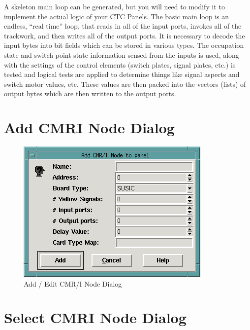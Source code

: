 A skeleton main loop can be generated, but you will need to modify it to
implement the actual logic of your CTC Panels.  The basic main loop is an
endless, ``real time'' loop, that reads in all of the input ports,
invokes all of the trackwork, and then writes all of the output ports. 
It is necessary to decode the input bytes into bit fields which can be
stored in various types.  The occupation state and switch point state
information sensed from the inputs is used, along with the settings of
the control elements (switch plates, signal plates, etc.) is tested and
logical tests are applied to determine things like signal aspects and
switch motor values, etc. These values are then packed into the vectors
(lists) of output bytes which are then written to the output ports.

\section{Add CMRI Node Dialog}

\begin{figure}[hbpt]
\begin{centering}
\includegraphics{AddEditCMR_INode.png}
\caption{Add / Edit CMR/I Node Dialog}
\label{fig:dispatcher:addeditcmrinodedialog}
\end{centering}
\end{figure}

\section{Select CMRI Node Dialog}

